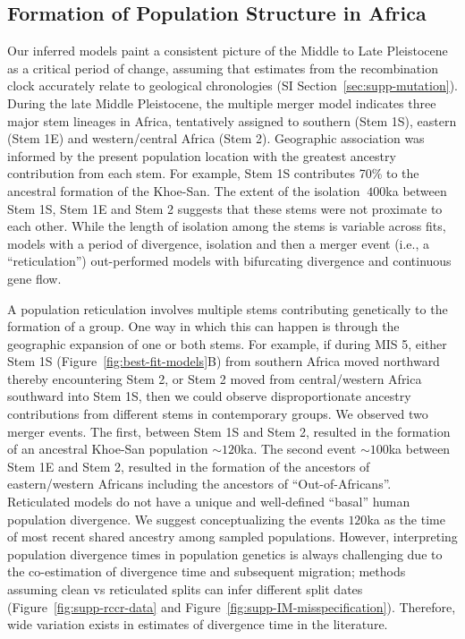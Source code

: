 \documentclass[]{article}
\begin{document}
\subsection*{Formation of Population Structure in Africa}

Our inferred models paint a consistent picture of the Middle to Late
Pleistocene as a critical period of change, assuming that estimates from the
recombination clock accurately relate to geological chronologies (SI
Section~\ref{sec:supp-mutation}). During the late Middle Pleistocene, the
multiple merger model indicates three major stem lineages in Africa,
tentatively assigned to southern (Stem 1S), eastern (Stem 1E) and
western/central Africa (Stem 2). Geographic association was informed by the
present population location with the greatest ancestry contribution from each
stem. For example, Stem 1S contributes 70\% to the ancestral formation of the
Khoe-San. The extent of the isolation $\>400$ka between Stem 1S, Stem 1E and Stem
2 suggests that these stems were not proximate to each other. While the length
of isolation among the stems is variable across fits, models with a period of
divergence, isolation and then a merger event (i.e., a ``reticulation'')
out-performed models with bifurcating divergence and continuous gene flow. 

A population reticulation involves multiple stems contributing genetically to
the formation of a group. One way in which this can happen is through the
geographic expansion of one or both stems. For example, if during MIS 5, either
Stem 1S (Figure~\ref{fig:best-fit-models}B) from southern Africa moved
northward thereby encountering Stem 2, or Stem 2 moved from central/western
Africa southward into Stem 1S, then we could observe disproportionate
ancestry contributions from different stems in contemporary groups. We observed
two merger events. The first, between Stem 1S and Stem 2, resulted in the
formation of an ancestral Khoe-San population $\sim120$ka. The second event
$\sim100$ka between Stem 1E and Stem 2, resulted in the formation of the
ancestors of eastern/western Africans including the ancestors of
``Out-of-Africans''. Reticulated models do not have a unique and 
well-defined ``basal'' human population divergence.
We suggest conceptualizing the events $120$ka as the time of most recent
shared ancestry among sampled populations.
However, interpreting population divergence times in population genetics is 
always challenging due
to the co-estimation of divergence time and subsequent migration;
methods assuming clean vs reticulated splits can infer different split dates
(Figure~\ref{fig:supp-rccr-data} and Figure~\ref{fig:supp-IM-misspecification}).
Therefore, wide variation exists in estimates of divergence time in the
literature\citep{Bergstrom2021-iw,Henn2018-rf}.
\end{document}
